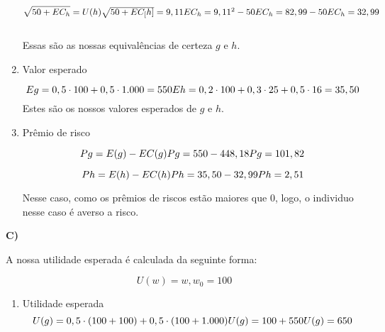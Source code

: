 \begin{flushleft}
\begin{enumerate}
	\begin{equation}
	\sqrt{50 + EC_{h}} = U(h)
	$$\\$$
	\sqrt{50 + EC_[h]} = 9,11
	$$\\$$
	EC_{h} = 9,11^{2} - 50
	$$\\$$
	EC_{h} = 82,99 - 50
	$$\\$$
	EC_{h} = 32,99
	\end{equation}
	\\ Essas são as nossas equivalências de certeza $g$ e $h$.
	
	\item Valor esperado
	
	\begin{equation}
	Eg = 0,5 \cdot 100 + 0,5 \cdot 1.000 = 550
	$$\\$$
	Eh = 0,2 \cdot 100 + 0,3 \cdot 25 + 0,5 \cdot 16 = 35,50
	\end{equation}
	Estes são os nossos valores esperados de $g$ e $h$.
	
	\item Prêmio de risco
	
	\begin{equation}
	Pg = E(g) - EC(g)
	$$\\$$
	Pg = 550 - 448,18
	$$\\$$
	Pg = 101,82
	\end{equation}
	
	\begin{equation}
	Ph = E(h) - EC(h)
	$$\\$$
	Ph = 35,50 - 32,99
	$$\\$$
	Ph = 2,51 
	\end{equation}
	
	Nesse caso, como os prêmios de riscos estão maiores que 0, logo, o individuo nesse caso é averso a risco.
\end{enumerate}

\singlespacing

\textbf{C)}

A nossa utilidade esperada é calculada da seguinte forma:

\begin{equation}
U(w) = w ,   w_{0} = 100
\end{equation}

\begin{enumerate}
	\item Utilidade esperada
	\begin{equation}
	U(g) = 0,5 \cdot (100 + 100) + 0,5 \cdot(100 + 1.000)
	$$\\$$
	U(g) = 100 + 550
	$$\\$$
	U(g) = 650
	\end{equation}
	

\end{enumerate}
\end{flushleft}
